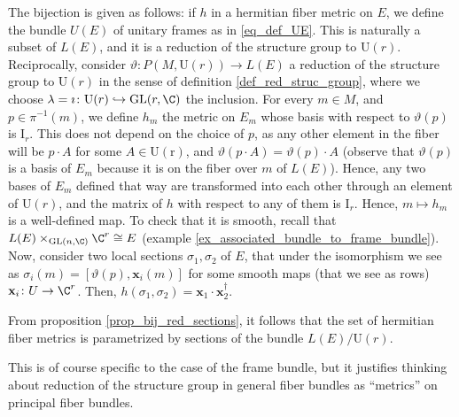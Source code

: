 The bijection is given as follows: if \(h\) in a hermitian fiber metric on \(E\), we define the bundle \(U(E)\) of unitary frames as in \eqref{eq_def_UE}. This is naturally a subset of \(L(E)\), and it is a reduction of the structure group to \(\mathrm{U}(r)\). Reciprocally, consider \(\vartheta \colon P(M, \mathrm{U}(r)) \to L(E)\) a reduction of the structure group to \(\mathrm{U}(r)\) in the sense of definition \ref{def_red_struc_group}, where we choose \(\lambda=\imath \colon \mathrm{U}(r) \hookrightarrow \mathrm{GL}(r, \C)\) the inclusion. For every \(m \in M\), and \(p \in \pi^{-1}(m)\), we define \(h_m\) the metric on \(E_m\) whose basis with respect to \(\vartheta(p)\) is \(\mathrm{I}_r\). This does not depend on  the choice of \(p\), as any other element in the fiber will be \(p\cdot A\) for some \(A \in \mathrm{U(r)}\), and \(\vartheta(p\cdot A)=\vartheta(p)\cdot A\) (observe that \(\vartheta(p)\) is a basis of \(E_m\) because it is on the fiber over \(m\) of \(L(E)\)). Hence, any two bases of \(E_m\) defined that way are transformed into each other through an element of \(\mathrm{U}(r)\), and the matrix of \(h\) with respect to any of them is \(\mathrm{I}_r\). Hence, \(m\mapsto h_m\) is a well-defined map. To check that it is smooth, recall that \(L(E) \times_{\mathrm{GL}(n, \C)}\C^r \cong E\) (example \ref{ex_associated_bundle_to_frame_bundle}). Now, consider two local sections \(\sigma_1, \sigma_2\) of \(E\), that under the isomorphism we see as \(\sigma_i(m)=[\vartheta(p), \mathbf{x}_i(m)]\) for some smooth maps (that we see as rows) \(\mathbf{x}_i\colon U \to \C^r\). Then, \(h(\sigma_1, \sigma_2)=\mathbf{x}_1\cdot \mathbf{x}_2^\dagger\).

\begin{obs}
    From proposition \ref{prop_bij_red_sections}, it follows that the set of hermitian fiber metrics is parametrized by sections of the bundle \(L(E)/\mathrm{U}(r)\).
\end{obs}

This is of course specific to the case of the frame bundle, but it justifies thinking about reduction of the structure group in general fiber bundles as ``metrics'' on principal fiber bundles.

